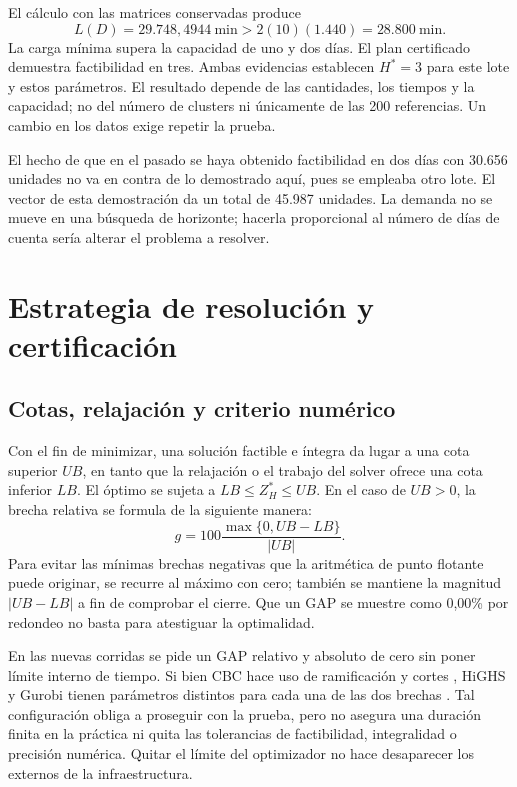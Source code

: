 \documentclass[12pt,a4paper,oneside]{article}
\begin{document}
El cálculo con las matrices conservadas produce
\begin{equation}
L(D)=29.748,4944\ \text{min}>2(10)(1.440)=28.800\ \text{min}.
\end{equation}
La carga mínima supera la capacidad de uno y dos días. El plan certificado demuestra factibilidad en tres. Ambas evidencias establecen $H^*=3$ para este lote y estos parámetros. El resultado depende de las cantidades, los tiempos y la capacidad; no del número de clusters ni únicamente de las 200 referencias. Un cambio en los datos exige repetir la prueba.

El hecho de que en el pasado se haya obtenido factibilidad en dos días con 30.656 unidades no va en contra de lo demostrado aquí, pues se empleaba otro lote. El vector de esta demostración da un total de 45.987 unidades. La demanda no se mueve en una búsqueda de horizonte; hacerla proporcional al número de días de cuenta sería alterar el problema a resolver.

\section{Estrategia de resolución y certificación}\label{sec:resolucion}
\subsection{Cotas, relajación y criterio numérico}
Con el fin de minimizar, una solución factible e íntegra da lugar a una cota superior $UB$, en tanto que la relajación o el trabajo del solver ofrece una cota inferior $LB$. El óptimo se sujeta a $LB\leq Z_H^*\leq UB$. En el caso de $UB>0$, la brecha relativa se formula de la siguiente manera:
\begin{equation}
g=100\frac{\max\{0,UB-LB\}}{|UB|}.
\end{equation}
Para evitar las mínimas brechas negativas que la aritmética de punto flotante puede originar, se recurre al máximo con cero; también se mantiene la magnitud $|UB-LB|$ a fin de comprobar el cierre. Que un GAP se muestre como 0,00\% por redondeo no basta para atestiguar la optimalidad.

En las nuevas corridas se pide un GAP relativo y absoluto de cero sin poner límite interno de tiempo. Si bien CBC hace uso de ramificación y cortes \cite{cbc}, HiGHS y Gurobi tienen parámetros distintos para cada una de las dos brechas \cite{highs,gurobi}. Tal configuración obliga a proseguir con la prueba, pero no asegura una duración finita en la práctica ni quita las tolerancias de factibilidad, integralidad o precisión numérica. Quitar el límite del optimizador no hace desaparecer los externos de la infraestructura.
\end{document}
